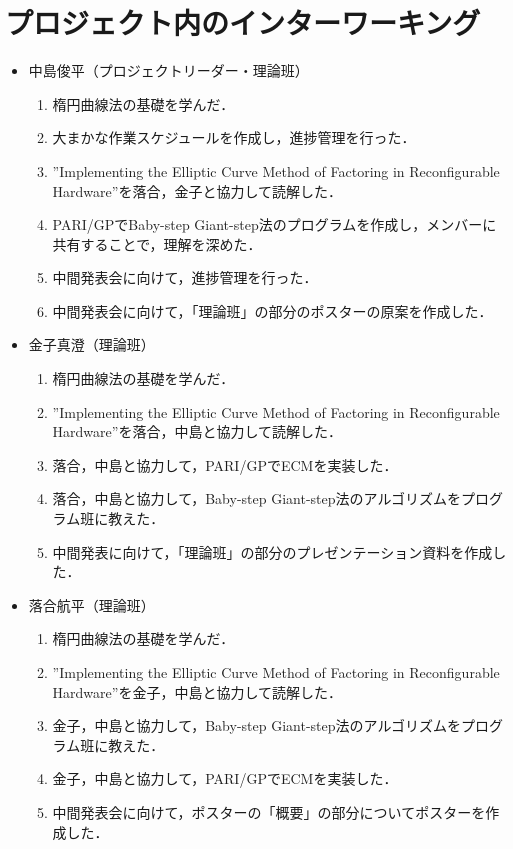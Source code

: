 \documentclass[openany,11pt,papersize]{jsbook}
\begin{document}

\chapter{プロジェクト内のインターワーキング}
\begin{itemize}
\item 中島俊平（プロジェクトリーダー・理論班）
 \begin{enumerate}
 \renewcommand{\labelenumi}{(\arabic{enumi})}
 \item 楕円曲線法の基礎を学んだ．
 \item 大まかな作業スケジュールを作成し，進捗管理を行った．
 \item''Implementing the Elliptic Curve Method of Factoring in Reconfigurable Hardware''を落合，金子と協力して読解した．
 \item PARI/GPでBaby-step Giant-step法のプログラムを作成し，メンバーに共有することで，理解を深めた．
 \item 中間発表会に向けて，進捗管理を行った．
 \item 中間発表会に向けて，「理論班」の部分のポスターの原案を作成した．
 \end{enumerate}
 
\item 金子真澄（理論班）
 \begin{enumerate}
 \renewcommand{\labelenumi}{(\arabic{enumi})}
 \item 楕円曲線法の基礎を学んだ．
 \item''Implementing the Elliptic Curve Method of Factoring in Reconfigurable Hardware''を落合，中島と協力して読解した．
 \item 落合，中島と協力して，PARI/GPでECMを実装した．
 \item 落合，中島と協力して，Baby-step Giant-step法のアルゴリズムをプログラム班に教えた．
 \item 中間発表に向けて，「理論班」の部分のプレゼンテーション資料を作成した．
 \end{enumerate}
 
\item 落合航平（理論班）
 \begin{enumerate}
 \renewcommand{\labelenumi}{(\arabic{enumi})}
 \item 楕円曲線法の基礎を学んだ．
 \item''Implementing the Elliptic Curve Method of Factoring in Reconfigurable Hardware''を金子，中島と協力して読解した．
 \item 金子，中島と協力して，Baby-step Giant-step法のアルゴリズムをプログラム班に教えた．
 \item 金子，中島と協力して，PARI/GPでECMを実装した．
 \item 中間発表会に向けて，ポスターの「概要」の部分についてポスターを作成した．
 \end{enumerate}


\end{itemize}
\end{document}
